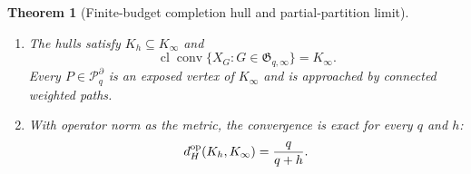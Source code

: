 \documentclass[journal,10pt]{IEEEtran}
\newtheorem{theorem}{Theorem}
\theoremstyle{definition}
\theoremstyle{remark}
\newcommand{\conv}{\operatorname{conv}}
\newcommand{\cl}{\operatorname{cl}}
\newcommand{\cP}{\mathcal P}
\newcommand{\fG}{\mathfrak G}
\begin{document}
\begin{theorem}[Finite-budget completion hull and partial-partition limit]
\begin{enumerate}[label=\textup{(\roman*)},leftmargin=2.1em]
\item The hulls satisfy $K_h\subseteq K_\infty$ and
\begin{equation}
  \cl\conv\{X_G:G\in\fG_{q,\infty}\}=K_\infty.
  \label{eq:unbounded-hull}
\end{equation}
Every $P\in\cP_q^\partial$ is an exposed vertex of $K_\infty$ and is
approached by connected weighted paths.

\item With operator norm as the metric, the convergence is exact for every
$q$ and $h$:
\begin{equation}
  d_H^{\rm op}(K_h,K_\infty)=\frac{q}{q+h}.
  \label{eq:hausdorff}
\end{equation}
\end{enumerate}
\end{theorem}
\end{document}
